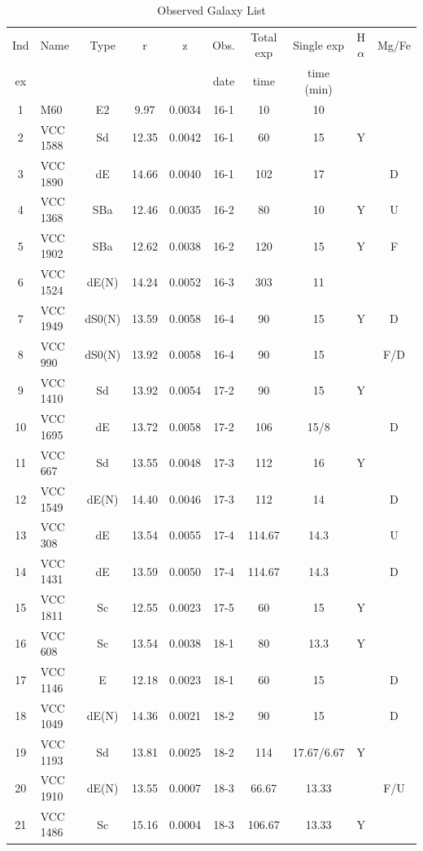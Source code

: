 \begin{table}[htbp]
\centering
\caption{Observed Galaxy List}
\label{tab:galaxy_list}
\begin{tabular}{c|l|c|c|c|c|c|c|c|c}
\hline
Ind & Name & Type & r & z & Obs. & Total exp & Single exp & H$\alpha$ & Mg/Fe \\
ex &  &  &  &  & date & time & time (min) &  &  \\
\hline
1 & M60 & E2 & 9.97 & 0.0034 & 16-1 & 10 & 10 &  &  \\
2 & VCC 1588 & Sd & 12.35 & 0.0042 & 16-1 & 60 & 15 & Y &  \\
3 & VCC 1890 & dE & 14.66 & 0.0040 & 16-1 & 102 & 17 &  & D \\
4 & VCC 1368 & SBa & 12.46 & 0.0035 & 16-2 & 80 & 10 & Y & U \\
5 & VCC 1902 & SBa & 12.62 & 0.0038 & 16-2 & 120 & 15 & Y & F \\
6 & VCC 1524 & dE(N) & 14.24 & 0.0052 & 16-3 & 303 & 11 &  &  \\
7 & VCC 1949 & dS0(N) & 13.59 & 0.0058 & 16-4 & 90 & 15 & Y & D \\
8 & VCC 990 & dS0(N) & 13.92 & 0.0058 & 16-4 & 90 & 15 &  & F/D \\
9 & VCC 1410 & Sd & 13.92 & 0.0054 & 17-2 & 90 & 15 & Y &  \\
10 & VCC 1695 & dE & 13.72 & 0.0058 & 17-2 & 106 & 15/8 &  & D \\
11 & VCC 667 & Sd & 13.55 & 0.0048 & 17-3 & 112 & 16 & Y &  \\
12 & VCC 1549 & dE(N) & 14.40 & 0.0046 & 17-3 & 112 & 14 &  & D \\
13 & VCC 308 & dE & 13.54 & 0.0055 & 17-4 & 114.67 & 14.3 &  & U \\
14 & VCC 1431 & dE & 13.59 & 0.0050 & 17-4 & 114.67 & 14.3 &  & D \\
15 & VCC 1811 & Sc & 12.55 & 0.0023 & 17-5 & 60 & 15 & Y &  \\
16 & VCC 608 & Sc & 13.54 & 0.0038 & 18-1 & 80 & 13.3 & Y &  \\
17 & VCC 1146 & E & 12.18 & 0.0023 & 18-1 & 60 & 15 &  & D \\
18 & VCC 1049 & dE(N) & 14.36 & 0.0021 & 18-2 & 90 & 15 &  & D \\
19 & VCC 1193 & Sd & 13.81 & 0.0025 & 18-2 & 114 & 17.67/6.67 & Y &  \\
20 & VCC 1910 & dE(N) & 13.55 & 0.0007 & 18-3 & 66.67 & 13.33 &  & F/U \\
21 & VCC 1486 & Sc & 15.16 & 0.0004 & 18-3 & 106.67 & 13.33 & Y &  \\
\hline
\end{tabular}
\end{table}